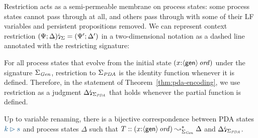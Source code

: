 Restriction acts as a semi-permeable membrane on process states: some
process states cannot pass through at all, and others pass through
with some of their LF variables and persistent propositions
removed. We can represent context restriction ${(\Psi;
  \Delta)}{\mbox{\lightning}}_{\Sigma} = (\Psi'; \Delta')$ in a two-dimensional notation
as a dashed line annotated with the restricting signature:
\begin{center}
\end{center}

For all process states that evolve from the initial state
$(x{:}{\langle {\sf gen} \rangle}\,{{\it ord}})$ under the signature $\Sigma_{\it
  Gen}$, restriction to $\Sigma_{\it PDA}$ is the identity function
whenever it is defined. Therefore, in the statement of
Theorem~\ref{thm:pda-encoding}, we use restriction as a judgment
${\Delta}{\mbox{\lightning}}_{\Sigma_{\it PDA}}$ that holds whenever the partial 
function is defined.

\bigskip
\begin{theorem}[Encoding]\label{thm:pda-encoding}
  Up to variable renaming, there is a bijective correspondence between
  PDA states $\obj{k \rhd s}$ and process states $\Delta$ such that
  $T :: (x{:}{\langle {\sf gen} \rangle}\,{{\it ord}}) \leadsto^*_{\Sigma_{\it Gen}}
  \Delta$ and ${\Delta}{\mbox{\lightning}}_{\Sigma_{\it
      PDA}}$.
\end{theorem}

